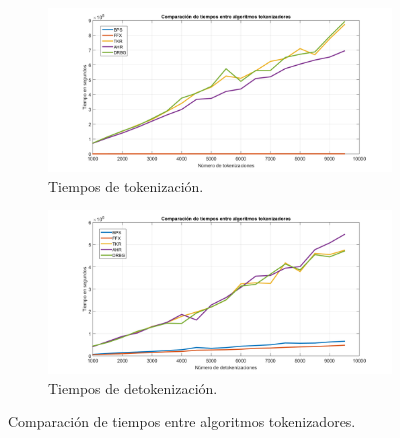 \begin{figure}
  \centering
  \begin{subfigure}{1\textwidth}
    \begin{center}
      \includegraphics[width=1\linewidth]
        {../../../../../diagramas_comunes/desempenio/tok_todos}
      \caption{Tiempos de tokenización.}
    \end{center}
  \end{subfigure}
  \begin{subfigure}{0.9\textwidth}
    \begin{center}
      \includegraphics[width=1\linewidth]{diagramas/detok_todos}
      \caption{Tiempos de detokenización.}
    \end{center}
  \end{subfigure}
  \caption{Comparación de tiempos entre algoritmos tokenizadores.}
  \label{figura:tok_todos}
\end{figure}

